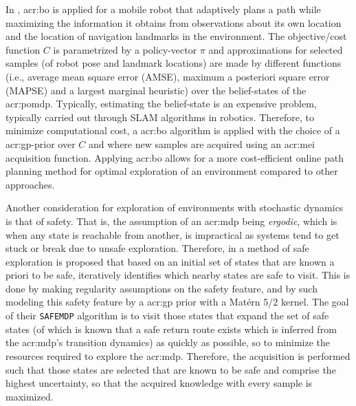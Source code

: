 In \cite{MartinezCantin2009}, \acrlong{acr:bo} is applied for a mobile robot that adaptively plans a path while maximizing the information it obtains from observations about its own location and the location of navigation landmarks in the environment.
The objective/cost function $C$ is parametrized by a policy-vector $\pi$ and approximations for selected samples (of robot pose and landmark locations) are made by different functions (i.e., average mean square error (AMSE), maximum a posteriori square error (MAPSE) and a largest marginal heuristic) over the belief-states of the \acrshort{acr:pomdp}.
Typically, estimating the belief-state is an expensive problem, typically carried out through SLAM algorithms in robotics.
Therefore, to minimize computational cost, a \acrlong{acr:bo} algorithm is applied with the choice of a \acrshort{acr:gp}-prior over $C$ and where new samples are acquired using an \acrshort{acr:mei} acquisition function.
Applying \acrlong{acr:bo} allows for a more cost-efficient online path planning method for optimal exploration of an environment compared to other approaches.

Another consideration for exploration of environments with stochastic dynamics is that of safety. That is, the assumption of an \acrshort{acr:mdp} being \textit{ergodic}, which is when any state is reachable from another, is impractical as systems tend to get stuck or break due to unsafe exploration. Therefore, in \cite{turchetta2016safe} a method of safe exploration is proposed that based on an initial set of states that are known a priori to be safe, iteratively identifies which nearby states are safe to visit.
This is done by making regularity assumptions on the safety feature, and by such modeling this safety feature by a \acrshort{acr:gp} prior with a Mat\'ern 5/2 kernel.
The goal of their \texttt{SAFEMDP} algorithm is to visit those states that expand the set of safe states (of which is known that a safe return route exists which is inferred from the \acrshort{acr:mdp}'s transition dynamics) as quickly as possible, so to minimize the resources required to explore the \acrshort{acr:mdp}.
Therefore, the acquisition is performed such that those states are selected that are known to be safe and comprise the highest uncertainty, so that the acquired knowledge with every sample is maximized.

